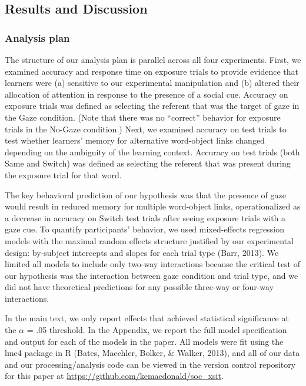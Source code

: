 \documentclass[authoryear, review]{elsarticle}
\begin{document}
\subsection{Results and Discussion}\label{results-and-discussion}

\subsubsection{Analysis plan}\label{analysis-plan}

The structure of our analysis plan is parallel across all four
experiments. First, we examined accuracy and response time on exposure
trials to provide evidence that learners were (a) sensitive to our
experimental manipulation and (b) altered their allocation of attention
in response to the presence of a social cue. Accuracy on exposure trials
was defined as selecting the referent that was the target of gaze in the
Gaze condition. (Note that there was no ``correct'' behavior for
exposure trials in the No-Gaze condition.) Next, we examined accuracy on
test trials to test whether learners' memory for alternative word-object
links changed depending on the ambiguity of the learning context.
Accuracy on test trials (both Same and Switch) was defined as selecting
the referent that was present during the exposure trial for that word.

The key behavioral prediction of our hypothesis was that the presence of
gaze would result in reduced memory for multiple word-object links,
operationalized as a decrease in accuracy on Switch test trials after
seeing exposure trials with a gaze cue. To quantify participants'
behavior, we used mixed-effects regression models with the maximal
random effects structure justified by our experimental design:
by-subject intercepts and slopes for each trial type (Barr, 2013). We
limited all models to include only two-way interactions because the
critical test of our hypothesis was the interaction between gaze
condition and trial type, and we did not have theoretical predictions
for any possible three-way or four-way interactions.

In the main text, we only report effects that achieved statistical
significance at the \(\alpha\) = .05 threshold. In the Appendix, we
report the full model specification and output for each of the models in
the paper. All models were fit using the lme4 package in R (Bates,
Maechler, Bolker, \& Walker, 2013), and all of our data and our
processing/analysis code can be viewed in the version control repository
for this paper at \url{https://github.com/kemacdonald/soc_xsit}.
\end{document}
